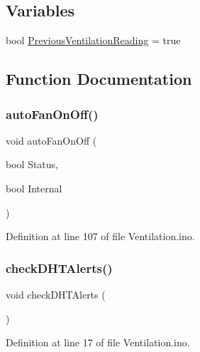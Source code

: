 \subsection*{Variables}
\begin{DoxyCompactItemize}
\item 
bool \mbox{\hyperlink{_ventilation_8ino_a2505d5b8aba92c783ea8743f1643abaa}{Previous\+Ventilation\+Reading}} = true
\end{DoxyCompactItemize}


\subsection{Function Documentation}
\mbox{\label{_ventilation_8ino_a1efe646523c8a1c6192234918105f04c}} 
\subsubsection{\texorpdfstring{autoFanOnOff()}{autoFanOnOff()}}
{\footnotesize\ttfamily void auto\+Fan\+On\+Off (\begin{DoxyParamCaption}\item[{bool}]{Status,  }\item[{bool}]{Internal }\end{DoxyParamCaption})}



Definition at line 107 of file Ventilation.\+ino.

\mbox{\label{_ventilation_8ino_ade7b2fa75ae4f31edd964e625070a87f}} 
\subsubsection{\texorpdfstring{checkDHTAlerts()}{checkDHTAlerts()}}
{\footnotesize\ttfamily void check\+D\+H\+T\+Alerts (\begin{DoxyParamCaption}{ }\end{DoxyParamCaption})}



Definition at line 17 of file Ventilation.\+ino.

\mbox{\label{_ventilation_8ino_abe4a9d766345913306e63d4cb41f1641}} 
